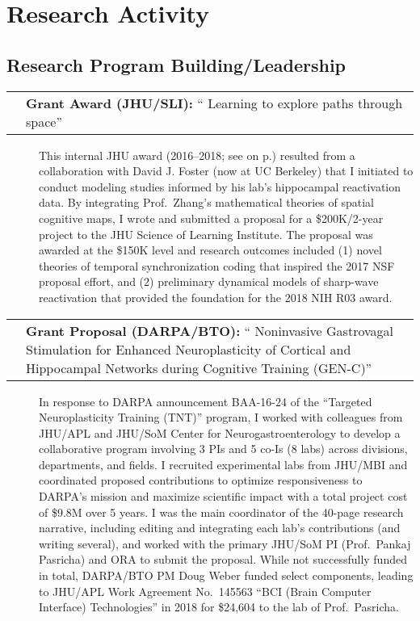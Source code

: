 \documentclass[10pt]{article}
\makeatletter
\newcommand{\unpubtitle}[1]{{\color{hopkinsblue} #1}}
\newcommand{\researchnote}[1]{
  \begin{description}
    \item[] {\hspace{2.2ex}\color{darkgray} #1}
  \end{description}
}
\newcommand{\researchactivity}[4]{
  \begin{minipage}[t]{\textwidth}
    \begin{tabular}{@{\hspace{2ex}}l>{\raggedright\arraybackslash}p{.8\textwidth}}
      \makebox[1.2in][l]{#1} & \textbf{#2:}
      ``\unpubtitle{#3}'' 
    \end{tabular}
  \researchnote{\hspace{1ex} #4}
  \end{minipage}
  \medbreak
}
\makeatother
\begin{document}
\section*{Research Activity}

\subsection*{Research Program Building/Leadership}
\label{sec:resprogram}

\researchactivity
{Mar. 2016--2018}
{Grant Award (JHU/SLI)}
{Learning to explore paths through space}
{This internal JHU award (2016--2018; see
  \emph{\nameref{sec:previnternalsupport}} on p.\pageref{sec:previnternalsupport})
  resulted from a collaboration with David J. Foster (now at UC Berkeley) that
  I initiated to conduct modeling studies informed by his lab’s hippocampal
  reactivation data. By integrating Prof.~Zhang’s mathematical theories of
  spatial cognitive maps, I wrote and submitted a proposal for a \$200K/2-year
  project to the JHU Science of Learning Institute. The proposal was awarded at
  the \$150K level and research outcomes included (1) novel theories of temporal
  synchronization coding that inspired the 2017 NSF proposal effort, and (2)
  preliminary dynamical models of sharp-wave reactivation that provided the
foundation for the 2018 NIH R03 award.}
\label{sec:ressli}

\researchactivity
{April--June 2016}
{Grant Proposal (DARPA/BTO)}
{Noninvasive Gastrovagal Stimulation for Enhanced Neuroplasticity of Cortical
and Hippocampal Networks during Cognitive Training (GEN-C)}
{In response to DARPA announcement BAA-16-24 of the “Targeted Neuroplasticity
  Training (TNT)” program, I worked with colleagues from JHU/APL and JHU/SoM
  Center for Neurogastroenterology to develop a collaborative program involving 3
  PIs and 5 co-Is (8 labs) across divisions, departments, and fields. I recruited
  experimental labs from JHU/MBI and coordinated proposed contributions to
  optimize responsiveness to DARPA’s mission and maximize scientific impact with
  a total project cost of \$9.8M over 5 years. I was the main coordinator of
  the 40-page research narrative, including editing and integrating each lab’s
  contributions (and writing several), and worked with the primary JHU/SoM PI
  (Prof.~Pankaj Pasricha) and ORA to submit the proposal. While not successfully
  funded in total, DARPA/BTO PM Doug Weber funded select components, leading to
  JHU/APL Work Agreement No.~145563 “BCI (Brain Computer Interface) Technologies”
in 2018 for \$24,604 to the lab of Prof.~Pasricha.}
\end{document}
